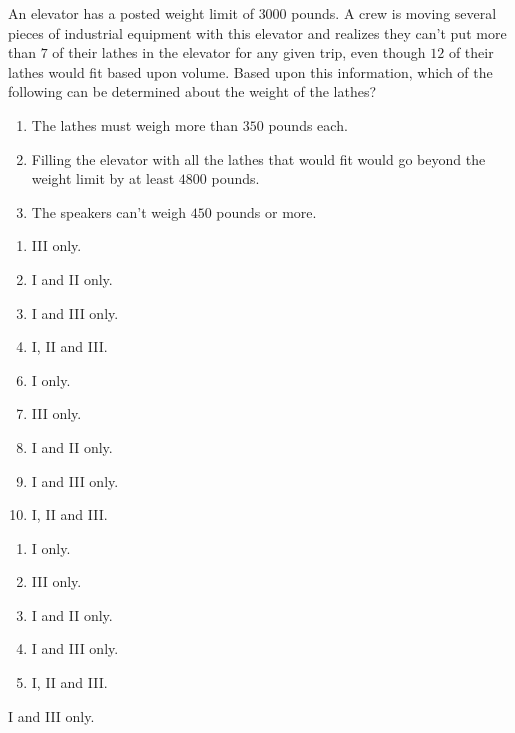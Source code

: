  
An elevator has a posted weight limit of $3000$ pounds.  A crew is moving several pieces of industrial equipment with this elevator and realizes they can't put more than $7$ of their lathes in the elevator for any given trip, even though $12$ of their lathes would fit based upon volume.  Based upon this information, which of the following can be determined about the weight of the lathes?
\begin{enumerate}[label=\Roman*.\hspace{1mm}]
\item The lathes must weigh more than $350$ pounds each.
\item Filling the elevator with all the lathes that would fit would go beyond the weight limit by at least $4800$ pounds.  
\item The speakers can't weigh $450$ pounds or more.
\end{enumerate}


\ifsat
	\begin{enumerate}[label=\Alph*)]
		\item III only.
		\item I and II only.
		\item I and III only. %
		\item I, II and III.
	\end{enumerate}
\else
\fi

\ifacteven
	\begin{enumerate}[label=\textbf{\Alph*.},itemsep=\fill,align=left]
		\setcounter{enumii}{5}
		\item I only.
		\item III only.
		\item I and II only.
		\addtocounter{enumii}{1}
		\item I and III only. %
		\item I, II and III.
	\end{enumerate}
\else
\fi

\ifactodd
	\begin{enumerate}[label=\textbf{\Alph*.},itemsep=\fill,align=left]
		\item I only.
		\item III only.
		\item I and II only.
		\item I and III only. %
		\item I, II and III.
	\end{enumerate}
\else
\fi

\ifgridin
 I and III only. %
		
\else
\fi

